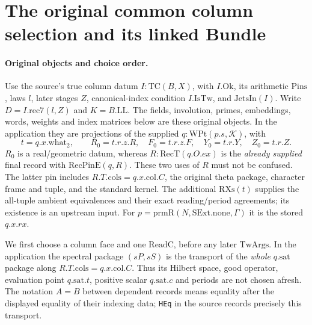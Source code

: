 \section{The original common column selection and its linked Bundle}
\label{sec:common-selected}


\paragraph{Original objects and choice order.}
Use the source's true column datum \(I:\mathrm{TC}(B,X)\), with
\(I.\mathrm{Ok}\), its arithmetic \(\mathrm{Pins}\), laws \(l\), later
stages \(Z\), canonical-index condition \(I.\mathrm{IsTw}\), and
\(\mathrm{JetsIn}(I)\). Write \(D=I.\mathrm{rec7}(l,Z)\) and
\(K=B.\mathrm{LL}\). The fields, involution, primes, embeddings, words,
weights and index matrices below are these original objects. In the
application they are projections of the supplied
\(q:\mathrm{WPt}(p.s,\mathcal K)\), with
\[
 t=q.x.\mathrm{what}_2,\qquad
 R_0=t.r.z.R,\quad F_0=t.r.z.F,\quad
 Y_0=t.r.Y,\quad Z_0=t.r.Z .
 \tag{CSR.1}
\]
\(R_0\) is a real/geometric datum, whereas \(R:\mathrm{RecT}(q.O.ex)\)
is the \emph{already supplied} final record with
\(\mathrm{RecPinE}(q,R)\). These two uses of \(R\) must not be confused.
The latter pin includes \(R.T.\mathrm{cols}=q.x.\mathrm{col}.C\), the
original theta package, character frame and tuple, and the standard
kernel. The additional \(\mathrm{RXs}(t)\) supplies the all-tuple
ambient equivalences and their exact reading/period agreements; its
existence is an upstream input. For \(p=\mathrm{prmR}(N,\mathrm{SExt.none},
\Gamma)\) it is the stored \(q.x.rx\).

We first choose a column face and one \(\mathrm{ReadC}\), before any
later \(\mathrm{TwArgs}\). In the application the spectral package
\((sP,sS)\) is the transport of the \emph{whole} \(q.\mathrm{sat}\)
package along \(R.T.\mathrm{cols}=q.x.\mathrm{col}.C\). Thus its
Hilbert space, good operator, evaluation point \(q.\mathrm{sat}.t\),
positive scalar \(q.\mathrm{sat}.c\) and periods are not chosen afresh.
The notation \(A=B\) between dependent records means equality after
the displayed equality of their indexing data; \texttt{HEq} in the
source records precisely this transport.

